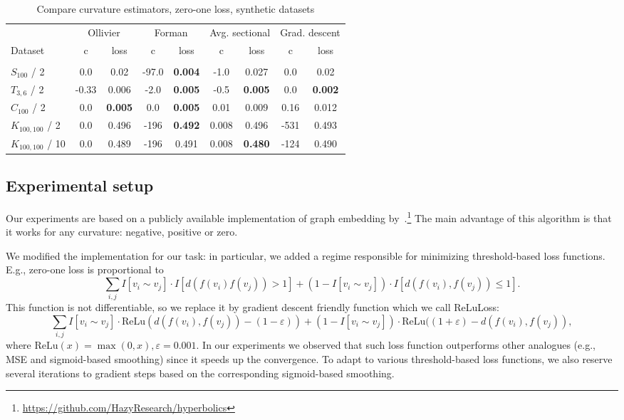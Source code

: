 \documentclass{article} %
\begin{document}
\begin{table}[t]
\caption{Compare curvature estimators, zero-one loss, synthetic datasets}
\label{tab:compare_zero_one_synth}
\begin{center}
\begin{tabular}{lcccccc|cc}
&
\multicolumn{2}{c}{Ollivier} &
\multicolumn{2}{c}{Forman} &
\multicolumn{2}{c}{Avg. sectional} &
\multicolumn{2}{|c}{Grad. descent} 
\\
Dataset & c & loss  & c & loss  & c & loss & c & loss %
\\
\hline \\
$S_{100}$ / 2 &
0.0 & 0.02 & 
-97.0 & \textbf{0.004} & 
-1.0 & 0.027 &
0.0 & 0.02
\\
$T_{3,6}$ / 2 &
-0.33 & 0.006 & 
-2.0 & \textbf{0.005} & 
-0.5 & \textbf{0.005} & 
0.0 & \textbf{0.002}  
\\
$C_{100}$ / 2 & 
0.0 & \textbf{0.005} & 
0.0 & \textbf{0.005} &
0.01 & 0.009 & 
0.16 & 0.012
\\
$K_{100,100}$ / 2 &
0.0 & 0.496 & 
-196 & \textbf{0.492} & 
0.008 & 0.496 & 
-531 & 0.493 
\\
$K_{100,100}$ / 10 &
0.0 & 0.489 & 
-196 & 0.491 & 
0.008 & \textbf{0.480} & 
-124 & 0.490 
\\
\end{tabular}
\end{center}
\end{table}

\subsection{Experimental setup}\label{sec:setup}

Our experiments are based on a publicly available implementation of graph embedding by~\citet{gu2019learning}.\footnote{\url{https://github.com/HazyResearch/hyperbolics}} The main advantage of this algorithm is that it works for any curvature: negative, positive or zero. 

We modified the implementation for our task: in particular, we added a regime responsible for minimizing threshold-based loss functions. 
E.g., zero-one loss is proportional to
\[
\sum_{i,j}  I[v_i \sim v_j] \cdot I[d(f(v_i)f(v_j)) > 1] + (1 - I[v_i \sim v_j]) \cdot I[d(f(v_i),f(v_j)) \le 1].
\]
This function is not differentiable, so we replace it by gradient descent friendly function which we call ReLuLoss:
\[
\sum_{i,j}  I[v_i \sim v_j] \cdot \mathrm{ReLu}(d(f(v_i),f(v_j)) - (1 - \varepsilon)) + (1 - I[v_i \sim v_j]) \cdot \mathrm{ReLu}((1 + \varepsilon) -d(f(v_i),f(v_j)),
\]
where 
$ \mathrm{ReLu}(x) = \max(0, x), \varepsilon = 0.001$.
In our experiments we observed that such loss function outperforms other analogues (e.g., MSE and sigmoid-based smoothing) since it speeds up the convergence. To adapt to various threshold-based loss functions, we also reserve several iterations to gradient steps based on the corresponding sigmoid-based smoothing.
\end{document}
